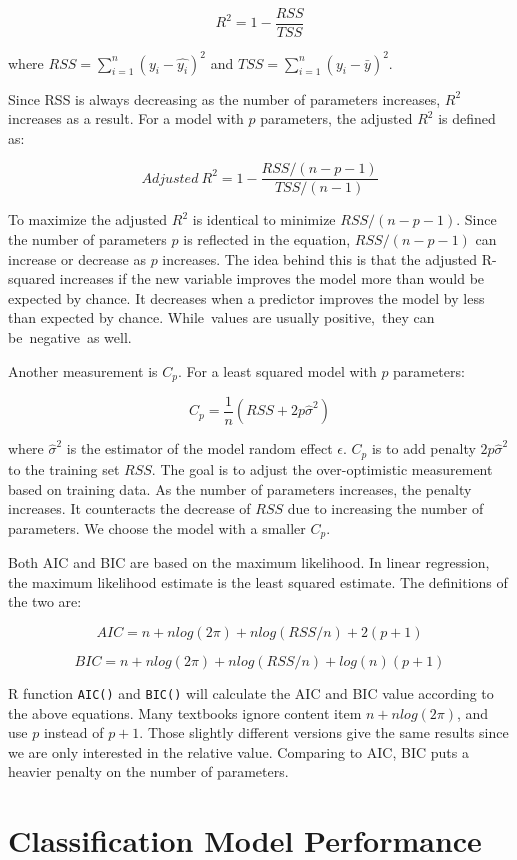 \documentclass[12pt,]{krantz}
\begin{document}
\[R^{2}=1-\frac{RSS}{TSS}\]

where \(RSS=\sum_{i=1}^{n}(y_{i}-\hat{y_{i}})^{2}\) and \(TSS=\sum_{i=1}^{n}(y_{i}-\bar{y})^{2}\).

Since RSS is always decreasing as the number of parameters increases, \(R^2\) increases as a result. For a model with \(p\) parameters, the adjusted \(R^2\) is defined as:

\[Adjusted\ R^{2}=1-\frac{RSS/(n-p-1)}{TSS/(n-1)}\]

To maximize the adjusted \(R^{2}\) is identical to minimize \(RSS/(n-p-1)\). Since the number of parameters \(p\) is reflected in the equation, \(RSS/(n-p-1)\) can increase or decrease as \(p\) increases. The idea behind this is that the adjusted R-squared increases if the new variable improves the model more than would be expected by chance. It decreases when a predictor improves the model by less than expected by chance. While~values are usually positive,~they can be~negative~as well.

Another measurement is \(C_{p}\). For a least squared model with \(p\) parameters:

\[C_{p}=\frac{1}{n}(RSS+2p\hat{\sigma}^{2})\]

where \(\hat{\sigma}^{2}\) is the estimator of the model random effect \(\epsilon\). \(C_{p}\) is to add penalty \(2p\hat{\sigma}^{2}\) to the training set \(RSS\). The goal is to adjust the over-optimistic measurement based on training data. As the number of parameters increases, the penalty increases. It counteracts the decrease of \(RSS\) due to increasing the number of parameters. We choose the model with a smaller \(C_{p}\).

Both AIC and BIC are based on the maximum likelihood. In linear regression, the maximum likelihood estimate is the least squared estimate. The definitions of the two are:

\[AIC=n+nlog(2\pi)+nlog(RSS/n)+2(p+1)\]

\[BIC=n+nlog(2\pi)+nlog(RSS/n)+log(n)(p+1)\]

R function \texttt{AIC()} and \texttt{BIC()} will calculate the AIC and BIC value according to the above equations. Many textbooks ignore content item \(n+nlog(2\pi)\), and use \(p\) instead of \(p+1\). Those slightly different versions give the same results since we are only interested in the relative value. Comparing to AIC, BIC puts a heavier penalty on the number of parameters.

\hypertarget{classification-model-performance}{%
\section{Classification Model Performance}\label{classification-model-performance}}
\end{document}
